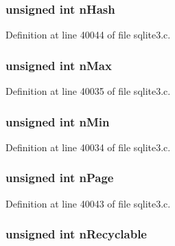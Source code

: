 \hypertarget{struct_p_cache1_a019adadb03d76527faa2cb8a12251497}{}
\subsubsection[{n\+Hash}]{\setlength{\rightskip}{0pt plus 5cm}unsigned int n\+Hash}\label{struct_p_cache1_a019adadb03d76527faa2cb8a12251497}


Definition at line 40044 of file sqlite3.\+c.

\hypertarget{struct_p_cache1_abb1923b8422bf5f73704009a86caf91b}{}
\subsubsection[{n\+Max}]{\setlength{\rightskip}{0pt plus 5cm}unsigned int n\+Max}\label{struct_p_cache1_abb1923b8422bf5f73704009a86caf91b}


Definition at line 40035 of file sqlite3.\+c.

\hypertarget{struct_p_cache1_ad7d171213abe001b8e7263c4bcd5221b}{}
\subsubsection[{n\+Min}]{\setlength{\rightskip}{0pt plus 5cm}unsigned int n\+Min}\label{struct_p_cache1_ad7d171213abe001b8e7263c4bcd5221b}


Definition at line 40034 of file sqlite3.\+c.

\hypertarget{struct_p_cache1_a8ffbf07cd3533c78ec7cbfb4129580f8}{}
\subsubsection[{n\+Page}]{\setlength{\rightskip}{0pt plus 5cm}unsigned int n\+Page}\label{struct_p_cache1_a8ffbf07cd3533c78ec7cbfb4129580f8}


Definition at line 40043 of file sqlite3.\+c.

\hypertarget{struct_p_cache1_ac8eee41aaf37858478a0e29b0c6e60ab}{}
\subsubsection[{n\+Recyclable}]{\setlength{\rightskip}{0pt plus 5cm}unsigned int n\+Recyclable}\label{struct_p_cache1_ac8eee41aaf37858478a0e29b0c6e60ab}


